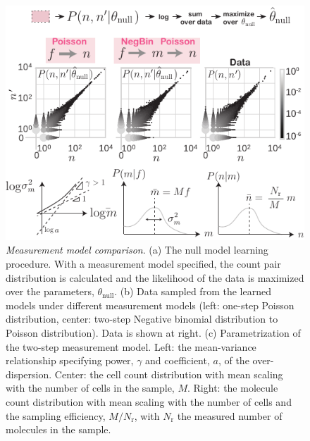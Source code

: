\documentclass[letterpaper,english,prl,reprint,longbibliography]{revtex4-1} %
\begin{document}
\begin{figure}[ht!]
\includegraphics{fig1_nullmodel_v5}
\centering{}
\caption{
\emph{Measurement model comparison}. (a) The null model learning procedure. With a measurement model specified, the count pair distribution is calculated and the likelihood of the data is maximized over the parameters, $\theta_{\textrm{null}}$. (b) Data sampled from the learned models under different measurement models (left: one-step Poisson distribution, center: two-step Negative binomial distribution to Poisson distribution). Data is shown at right. (c) Parametrization of the two-step measurement model. Left: the mean-variance relationship specifying power, $\gamma$ and coefficient, $a$, of the over-dispersion. Center: the cell count distribution with mean scaling with the number of cells in the sample, $M$. Right: the molecule count distribution with mean scaling with the number of cells and the sampling efficiency, $M/N_{\textrm{r}}$, with $N_{\textrm{r}}$ the measured number of molecules in the sample.
\label{fig:nullstats}}
\end{figure}
\end{document}
